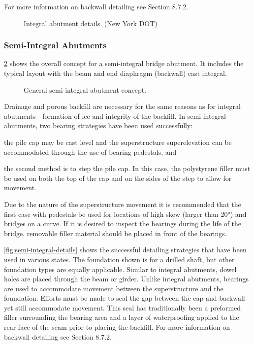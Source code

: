 For more information on backwall detailing see Section 8.7.2.

\begin{figure}
  \caption{Integral abutment details. (New York DOT)}
  \label{fig:integral-abutment-details2}
\end{figure}

\subsubsection{Semi-Integral Abutments}
\cref{fig:semi-integral-abutment-concept} shows the overall concept for a semi-integral bridge abutment. It includes the typical layout with the beam and end diaphragm (backwall) cast integral.

\begin{figure}
  \caption{General semi-integral abutment concept.}
  \label{fig:semi-integral-abutment-concept}
\end{figure}

Drainage and porous backfill are necessary for the same reasons as for integral abutments—formation of ice and integrity of the backfill. In semi-integral abutments, two bearing strategies have been used successfully: 
\begin{enumerate*}
  \item the pile cap may be cast level and the superstructure superelevation can be accommodated through the use of bearing pedestals, and 
  \item the second method is to step the pile cap. In this case, the polystyrene filler must be used on both the top of the cap and on the sides of the step to allow for movement. 
\end{enumerate*}
Due to the nature of the superstructure movement it is recommended that the first case with pedestals be used for locations of high skew (larger than 20°) and bridges on a curve. If it is desired to inspect the bearings during the life of the bridge, removable filler material should be placed in front of the bearings.

\cref{fig:semi-integral-details} shows the successful detailing strategies that have been used in various states. The foundation shown is for a drilled shaft, but other foundation types are equally applicable. Similar to integral abutments, dowel holes are placed through the beam or girder. Unlike integral abutments, bearings are used to accommodate movement between the superstructure and the foundation. Efforts must be made to seal the gap between the cap and backwall yet still accommodate movement. This seal has traditionally been a preformed filler surrounding the bearing area and a layer of waterproofing applied to the rear face of the seam prior to placing the backfill. For more information on backwall detailing see Section 8.7.2.

